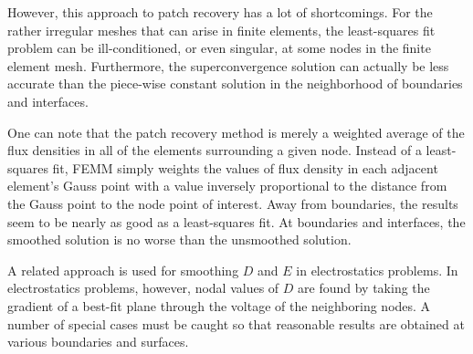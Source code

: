 \documentclass[12pt]{report}
\begin{document}
However, this approach to patch recovery has a lot of shortcomings.
For the rather irregular meshes that can arise in finite elements,
the least-squares fit problem can be ill-conditioned, or even
singular, at some nodes in the finite element mesh.  Furthermore,
the superconvergence solution can actually be less accurate than
the piece-wise constant solution in the neighborhood of boundaries
and interfaces.

One can note that the patch recovery method is merely a weighted
average of the flux densities in all of the elements surrounding a
given node.  Instead of a least-squares fit, FEMM simply weights
the values of flux density in each adjacent element's Gauss point
with a value inversely proportional to the distance from the Gauss
point to the node point of interest.  Away from boundaries, the
results seem to be nearly as good as a least-squares fit.  At
boundaries and interfaces, the smoothed solution is no worse than
the unsmoothed solution.

A related approach is used for smoothing $D$ and $E$ in
electrostatics problems. In electrostatics problems, however, nodal
values of $D$ are found by taking the gradient of a best-fit plane
through the voltage of the neighboring nodes. A number of special
cases must be caught so that reasonable results are obtained at
various boundaries and surfaces.
\end{document}
